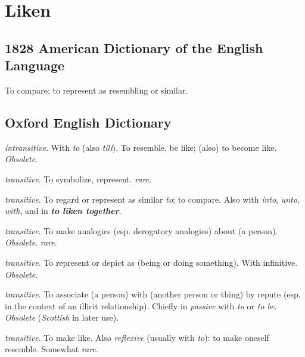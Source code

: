 \section{Liken}
	\label{LIKEN}
	

\subsection{1828 American Dictionary of the English Language} %
	\label{LIKEN-1828}

	\begin{compactitem}
		\item To compare; to represent as resembling or similar.
	\end{compactitem}

\subsection{Oxford English Dictionary} %
	\label{LIKEN-OED}

	\begin{compactitem}
		\item[1a] \textit{intransitive}. With \textit{to} (also \textit{till}). To resemble, be like; (also) to become like. \textit{Obsolete}.
		\item[1b] \textit{transitive}. To symbolize, represent. \textit{rare}.
		\item[2a] \textit{transitive}. To regard or represent as similar \textit{to}; to compare. Also with \textit{into}, \textit{unto}, \textit{with}, and in \textit{\textbf{to liken together}}.
		\item[2b] \textit{transitive}. To make analogies (esp. derogatory analogies) about (a person). \textit{Obsolete}. \textit{rare}.
		\item[2c] \textit{transitive}. To represent or depict as (being or doing something). With infinitive. \textit{Obsolete}.
		\item[2d] \textit{transitive}. To associate (a person) with (another person or thing) by repute (esp. in the context of an illicit relationship). Chiefly in \textit{passive} with \textit{to} or \textit{to be}. \textit{Obsolete} (\textit{Scottish} in later use).
		\item[3] \textit{transitive}. To make like. Also \textit{reflexive} (usually with \textit{to}): to make oneself resemble. Somewhat \textit{rare}.
	\end{compactitem}

